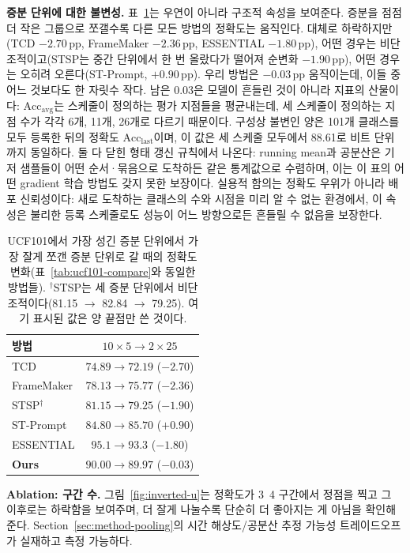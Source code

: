 \documentclass[11pt]{article}
\begin{document}
\textbf{증분 단위에 대한 불변성.} 표~\ref{tab:invariance}는 우연이
아니라 구조적 속성을 보여준다. 증분을 점점 더 작은 그룹으로 쪼갤수록
다른 모든 방법의 정확도는 움직인다. 대체로 하락하지만(TCD
$-2.70$\,pp, FrameMaker $-2.36$\,pp, ESSENTIAL $-1.80$\,pp), 어떤 경우는
비단조적이고(STSP는 중간 단위에서 한 번 올랐다가 떨어져 순변화
$-1.90$\,pp), 어떤 경우는 오히려 오른다(ST-Prompt, $+0.90$\,pp). 우리
방법은 $-0.03$\,pp 움직이는데, 이들 중 어느 것보다도 한 자릿수 작다.
남은 0.03은 모델이 흔들린 것이 아니라 지표의 산물이다:
$\mathrm{Acc}_{\mathrm{avg}}$는 스케줄이 정의하는 평가 지점들을 평균내는데,
세 스케줄이 정의하는 지점 수가 각각 6개, 11개, 26개로 다르기 때문이다.
구성상 불변인 양은 101개 클래스를 모두 등록한 뒤의 정확도
$\mathrm{Acc}_{\mathrm{last}}$이며, 이 값은 세 스케줄 모두에서 88.61로
비트 단위까지 동일하다. 둘 다 닫힌 형태 갱신 규칙에서 나온다: running
mean과 공분산은 기저 샘플들이 어떤 순서·묶음으로 도착하든 같은 통계값으로
수렴하며, 이는 이 표의 어떤 gradient 학습 방법도 갖지 못한 보장이다. 실용적 함의는 정확도
우위가 아니라 배포 신뢰성이다: 새로 도착하는 클래스의 수와 시점을 미리
알 수 없는 환경에서, 이 속성은 불리한 등록 스케줄로도 성능이 어느
방향으로든 흔들릴 수 없음을 보장한다.

\begin{table}[h]
\centering
\caption{UCF101에서 가장 성긴 증분 단위에서 가장 잘게 쪼갠 증분 단위로
갈 때의 정확도 변화(표~\ref{tab:ucf101-compare}와 동일한 방법들).
$^\dagger$STSP는 세 증분 단위에서 비단조적이다(81.15 $\to$ 82.84
$\to$ 79.25). 여기 표시된 값은 양 끝점만 쓴 것이다.}
\label{tab:invariance}
\small
\begin{tabular}{@{}lc@{}}
\toprule
방법 & $10\times5 \to 2\times25$ \\
\midrule
TCD & $74.89 \to 72.19$ ($-2.70$) \\
FrameMaker & $78.13 \to 75.77$ ($-2.36$) \\
STSP$^\dagger$ & $81.15 \to 79.25$ ($-1.90$) \\
ST-Prompt & $84.80 \to 85.70$ ($+0.90$) \\
ESSENTIAL & $95.1 \to 93.3$ ($-1.80$) \\
\textbf{Ours} & $90.00 \to 89.97$ (\textbf{$-0.03$}) \\
\bottomrule
\end{tabular}
\end{table}

\textbf{Ablation: 구간 수.} 그림~\ref{fig:inverted-u}는 정확도가 3~4
구간에서 정점을 찍고 그 이후로는 하락함을 보여주며, 더 잘게 나눌수록
단순히 더 좋아지는 게 아님을 확인해준다. Section~\ref{sec:method-pooling}의
시간 해상도/공분산 추정 가능성 트레이드오프가 실재하고 측정 가능하다.
\end{document}
